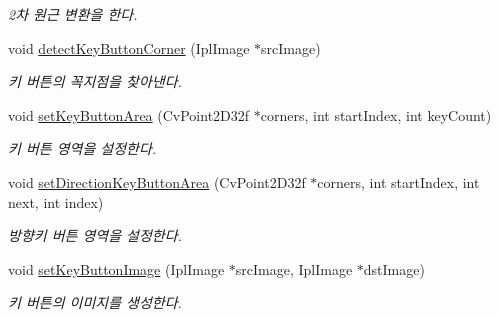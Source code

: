 \begin{DoxyCompactItemize}
\begin{DoxyCompactList}\small\item\em 2차 원근 변환을 한다. \end{DoxyCompactList}\item 
\hypertarget{class_fk_paper_keyboard___type_a_a6829e8c434daf753bb2a58e8b813ed21}{}void \hyperlink{class_fk_paper_keyboard___type_a_a6829e8c434daf753bb2a58e8b813ed21}{detect\+Key\+Button\+Corner} (Ipl\+Image $\ast$src\+Image)\label{class_fk_paper_keyboard___type_a_a6829e8c434daf753bb2a58e8b813ed21}

\begin{DoxyCompactList}\small\item\em 키 버튼의 꼭지점을 찾아낸다. \end{DoxyCompactList}\item 
\hypertarget{class_fk_paper_keyboard___type_a_a70f0e0b2002c0b64915142e4f6316a68}{}void \hyperlink{class_fk_paper_keyboard___type_a_a70f0e0b2002c0b64915142e4f6316a68}{set\+Key\+Button\+Area} (Cv\+Point2\+D32f $\ast$corners, int start\+Index, int key\+Count)\label{class_fk_paper_keyboard___type_a_a70f0e0b2002c0b64915142e4f6316a68}

\begin{DoxyCompactList}\small\item\em 키 버튼 영역을 설정한다. \end{DoxyCompactList}\item 
\hypertarget{class_fk_paper_keyboard___type_a_a232dfbd787c82beb139d7d9f32c0bbaf}{}void \hyperlink{class_fk_paper_keyboard___type_a_a232dfbd787c82beb139d7d9f32c0bbaf}{set\+Direction\+Key\+Button\+Area} (Cv\+Point2\+D32f $\ast$corners, int start\+Index, int next, int index)\label{class_fk_paper_keyboard___type_a_a232dfbd787c82beb139d7d9f32c0bbaf}

\begin{DoxyCompactList}\small\item\em 방향키 버튼 영역을 설정한다. \end{DoxyCompactList}\item 
\hypertarget{class_fk_paper_keyboard___type_a_a8159192ee3fdb868e91b4766c4ff1508}{}void \hyperlink{class_fk_paper_keyboard___type_a_a8159192ee3fdb868e91b4766c4ff1508}{set\+Key\+Button\+Image} (Ipl\+Image $\ast$src\+Image, Ipl\+Image $\ast$dst\+Image)\label{class_fk_paper_keyboard___type_a_a8159192ee3fdb868e91b4766c4ff1508}

\begin{DoxyCompactList}\small\item\em 키 버튼의 이미지를 생성한다. \end{DoxyCompactList}\end{DoxyCompactItemize}
